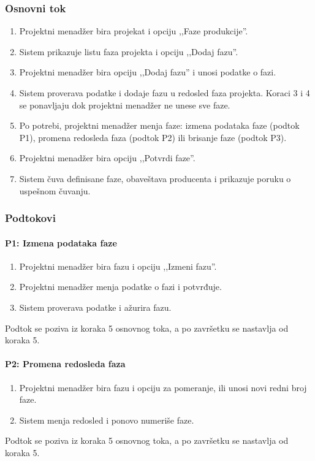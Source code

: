 \subsubsection*{Osnovni tok}
\begin{enumerate}
    \item Projektni menadžer bira projekat i opciju ,,Faze produkcije''.
    \item Sistem prikazuje listu faza projekta i opciju ,,Dodaj fazu''.
    \item Projektni menadžer bira opciju ,,Dodaj fazu'' i unosi podatke o fazi.
    \item Sistem proverava podatke i dodaje fazu u redosled faza projekta. Koraci 3 i 4 se ponavljaju dok projektni menadžer ne unese sve faze.
    \item Po potrebi, projektni menadžer menja faze: izmena podataka faze (podtok P1), promena redosleda faza (podtok P2) ili brisanje faze (podtok P3).
    \item Projektni menadžer bira opciju ,,Potvrdi faze''.
    \item Sistem čuva definisane faze, obaveštava producenta i prikazuje poruku o uspešnom čuvanju.
\end{enumerate}

\subsubsection*{Podtokovi}

\paragraph*{P1: Izmena podataka faze}
\begin{enumerate}
    \item Projektni menadžer bira fazu i opciju ,,Izmeni fazu''.
    \item Projektni menadžer menja podatke o fazi i potvrđuje.
    \item Sistem proverava podatke i ažurira fazu.
\end{enumerate}
Podtok se poziva iz koraka 5 osnovnog toka, a po završetku se nastavlja od koraka 5.

\paragraph*{P2: Promena redosleda faza}
\begin{enumerate}
    \item Projektni menadžer bira fazu i opciju za pomeranje, ili unosi novi redni broj faze.
    \item Sistem menja redosled i ponovo numeriše faze.
\end{enumerate}
Podtok se poziva iz koraka 5 osnovnog toka, a po završetku se nastavlja od koraka 5.

